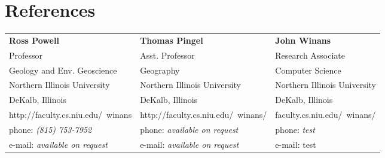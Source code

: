 \documentclass{cv_TOH}
\begin{document}
\section{References}
\begin{tabular}{@{}p{5cm}p{5cm}p{5cm}}
\textbf{Ross Powell}                    &  \textbf{Thomas Pingel}               & \textbf{John Winans}   \\
Professor                               &  Asst. Professor                      &  Research Associate    \\
Geology and Env. Geoscience             &  Geography                            &  Computer Science      \\
Northern Illinois University            &  Northern Illinois University         &  Northern Illinois University \\
DeKalb, Illinois                        &  DeKalb, Illinois                     &  DeKalb, Illinois  \\
http://faculty.cs.niu.edu/~winans       & http://faculty.cs.niu.edu/~winans/    &  faculty.cs.niu.edu/~winans/ \\
phone: \textsl{(815) 753-7952}          &  phone: \textsl{available on request} &  phone: \textsl{test}  \\
e-mail: \textsl{available on request}   &  e-mail: \textsl{available on request}&  e-mail: test  \\
\end{tabular}
 
\end{document}
